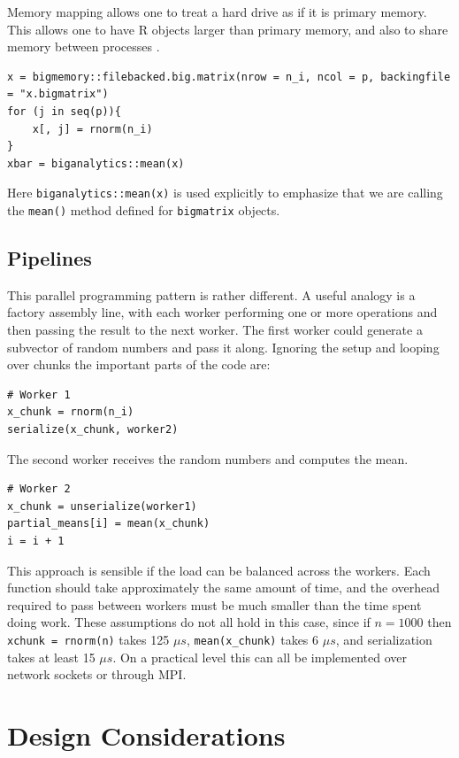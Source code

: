 \documentclass[12pt]{article}
\begin{document}
Memory mapping allows one to treat a hard drive as if it is primary memory.
This allows one to have R objects larger than primary memory, and also to
share memory between processes \cite{bigmemory}.

\begin{verbatim}
x = bigmemory::filebacked.big.matrix(nrow = n_i, ncol = p, backingfile = "x.bigmatrix")
for (j in seq(p)){
    x[, j] = rnorm(n_i)
}
xbar = biganalytics::mean(x)
\end{verbatim}

Here \texttt{biganalytics::mean(x)} is used explicitly to emphasize that we
are calling the \texttt{mean()} method defined for \texttt{bigmatrix}
objects.

\subsection{Pipelines}

This parallel programming pattern is rather different. A useful analogy is a
factory assembly line, with each worker performing one or more operations
and then passing the result to the next worker. The first worker could generate a
subvector of random numbers and pass it along. Ignoring the setup and
looping over chunks the important parts of the code are:

\begin{verbatim}
# Worker 1
x_chunk = rnorm(n_i)
serialize(x_chunk, worker2)
\end{verbatim}

The second worker receives the random numbers and computes the mean.

\begin{verbatim}
# Worker 2
x_chunk = unserialize(worker1)
partial_means[i] = mean(x_chunk)
i = i + 1
\end{verbatim}

This approach is sensible if the load can be balanced across the workers.
Each function should take approximately the same amount of time, and the
overhead required to pass between workers must be much smaller than the
time spent doing work. These assumptions do not all hold in this case,
since if $n = 1000$ then \texttt{xchunk = rnorm(n)} takes 125 $\mu s$,
\texttt{mean(x\_chunk)} takes 6 $\mu s$, and serialization takes at least
15 $\mu s$. On a practical level this can all be implemented over network
sockets or through MPI.

\section{Design Considerations}
\end{document}
